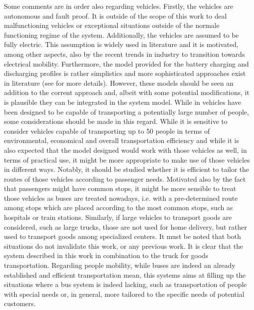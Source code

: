 Some comments are in order also regarding vehicles. Firstly, the vehicles are autonomous and fault proof. It is outside of the scope of this work to deal malfunctioning vehicles or exceptional situations outside of the normale functioning regime of the system. Additionally, the vehicles are assumed to be fully electric. This assumption is widely used in literature and it is motivated, among other aspects, also by the recent trends in industry to transition towards electrical mobility. Furthermore, the model provided for the battery charging and discharging profiles is rather simplistics and more sophisticated approaches exist in literature (see  for more details). However, these models should be seen an addition to the corrent approach and, albeit with some potential modifications, it is plausible they can be integrated in the system model. While in \cite{project_thesis} vehicles have been designed to be capable of transporting a potentially large number of people, some considerations should be made in this regard. While it is sensitive to consider vehicles capable of transporting up to 50 people in terms of environmental, economical and overall transportation efficiency and while it is also expected that the model designed would work with those vehicles as well, in terms of practical use, it might be more appropriate to make use of those vehicles in different ways. Notably, it should be studied whether it is efficient to tailor the routes of those vehicles according to passenger needs. Motivated also by the fact that passengers might have common stops, it might be more sensible to treat those vehicles as buses are treated nowadays, i.e. with a pre-determined route among stops which are placed according to the most common stops, such as hospitals or train stations. Similarly, if large vehicles to transport goods are considered, such as large trucks, those are not used for home delivery, but rather used to transport goods among specialized centers. It must be noted that both situations do not invalidate this work, or any previous work. It is clear that the system described in this work in combination to the truck for goods transportation. Regarding people mobility, while buses are indeed an already established and efficient transportation mean, this systems aims at filling up the situations where a bus system is indeed lacking, such as transportation of people with special needs or, in general, more tailored to the specific needs of potential customers. \\
